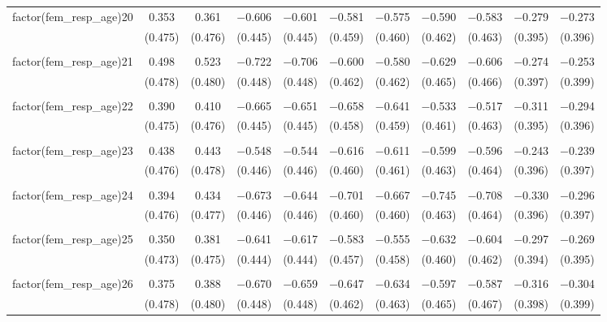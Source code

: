 \begin{table}[!htbp]
\begin{tabular}{@{\extracolsep{5pt}}lcccccccccc}
 factor(fem\_resp\_age)20 & 0.353 & 0.361 & $-$0.606 & $-$0.601 & $-$0.581 & $-$0.575 & $-$0.590 & $-$0.583 & $-$0.279 & $-$0.273 \\ 
  & (0.475) & (0.476) & (0.445) & (0.445) & (0.459) & (0.460) & (0.462) & (0.463) & (0.395) & (0.396) \\ 
  & & & & & & & & & & \\ 
 factor(fem\_resp\_age)21 & 0.498 & 0.523 & $-$0.722 & $-$0.706 & $-$0.600 & $-$0.580 & $-$0.629 & $-$0.606 & $-$0.274 & $-$0.253 \\ 
  & (0.478) & (0.480) & (0.448) & (0.448) & (0.462) & (0.462) & (0.465) & (0.466) & (0.397) & (0.399) \\ 
  & & & & & & & & & & \\ 
 factor(fem\_resp\_age)22 & 0.390 & 0.410 & $-$0.665 & $-$0.651 & $-$0.658 & $-$0.641 & $-$0.533 & $-$0.517 & $-$0.311 & $-$0.294 \\ 
  & (0.475) & (0.476) & (0.445) & (0.445) & (0.458) & (0.459) & (0.461) & (0.463) & (0.395) & (0.396) \\ 
  & & & & & & & & & & \\ 
 factor(fem\_resp\_age)23 & 0.438 & 0.443 & $-$0.548 & $-$0.544 & $-$0.616 & $-$0.611 & $-$0.599 & $-$0.596 & $-$0.243 & $-$0.239 \\ 
  & (0.476) & (0.478) & (0.446) & (0.446) & (0.460) & (0.461) & (0.463) & (0.464) & (0.396) & (0.397) \\ 
  & & & & & & & & & & \\ 
 factor(fem\_resp\_age)24 & 0.394 & 0.434 & $-$0.673 & $-$0.644 & $-$0.701 & $-$0.667 & $-$0.745 & $-$0.708 & $-$0.330 & $-$0.296 \\ 
  & (0.476) & (0.477) & (0.446) & (0.446) & (0.460) & (0.460) & (0.463) & (0.464) & (0.396) & (0.397) \\ 
  & & & & & & & & & & \\ 
 factor(fem\_resp\_age)25 & 0.350 & 0.381 & $-$0.641 & $-$0.617 & $-$0.583 & $-$0.555 & $-$0.632 & $-$0.604 & $-$0.297 & $-$0.269 \\ 
  & (0.473) & (0.475) & (0.444) & (0.444) & (0.457) & (0.458) & (0.460) & (0.462) & (0.394) & (0.395) \\ 
  & & & & & & & & & & \\ 
 factor(fem\_resp\_age)26 & 0.375 & 0.388 & $-$0.670 & $-$0.659 & $-$0.647 & $-$0.634 & $-$0.597 & $-$0.587 & $-$0.316 & $-$0.304 \\ 
  & (0.478) & (0.480) & (0.448) & (0.448) & (0.462) & (0.463) & (0.465) & (0.467) & (0.398) & (0.399) \\ 

\end{tabular}
\end{table}
